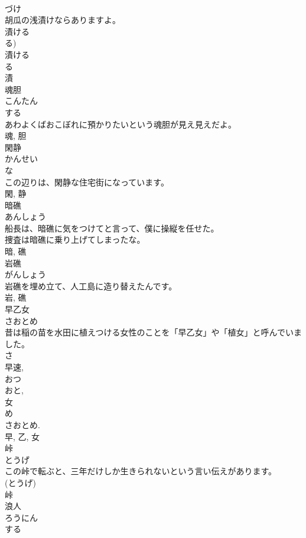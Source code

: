 \documentclass[8pt]{extreport}
\begin{document}
\begin{CJK}{UTF8}{min}
\\	づけ	
\\	胡瓜の浅漬けならありますよ。	
\\	漬ける 
\\	る) 
\\	漬ける 
\\	る 
\\	漬	
\\	魂胆	
\\	こんたん	
\\	する 
\\	あわよくばおこぼれに預かりたいという魂胆が見え見えだよ。	
\\	魂, 胆	
\\	閑静	
\\	かんせい	
\\	な 
\\	この辺りは、閑静な住宅街になっています。	
\\	閑, 静	
\\	暗礁	
\\	あんしょう	
\\	船長は、暗礁に気をつけてと言って、僕に操縦を任せた。	
\\	捜査は暗礁に乗り上げてしまったな。	
\\	暗, 礁	
\\	岩礁	
\\	がんしょう	
\\	岩礁を埋め立て、人工島に造り替えたんです。	
\\	岩, 礁	
\\	早乙女	
\\	さおとめ	
\\	昔は稲の苗を水田に植えつける女性のことを「早乙女」や「植女」と呼んでいました。	
\\	さ 
\\	早速, 
\\	おつ 
\\	おと, 
\\	女 
\\	め 
\\	さおとめ. 
\\	早, 乙, 女	
\\	峠	
\\	とうげ	
\\	この峠で転ぶと、三年だけしか生きられないという言い伝えがあります。	
\\	(とうげ) 
\\	峠	
\\	浪人	
\\	ろうにん	
\\	する 

\end{CJK}
\end{document}

